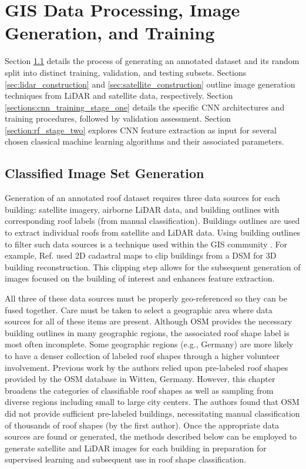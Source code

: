  
\section{GIS Data Processing, Image Generation, and Training}\label{section:image_gen_methods}



Section \ref{section:image_generation} details the process of generating an annotated dataset and its random split into distinct training, validation, and testing subsets. Sections \ref{sec:lidar_construction} and \ref{sec:satellite_construction} outline image generation techniques from LiDAR and satellite data, respectively.  Section \ref{sections:cnn_training_stage_one} details the specific \ac{CNN} architectures and training procedures, followed by validation assessment. Section \ref{section:rf_stage_two} explores \ac{CNN} feature extraction as input for several chosen classical machine learning algorithms and their associated parameters.

\subsection{Classified Image Set Generation}\label{section:image_generation}

Generation of an annotated roof dataset requires three data sources for each building: satellite imagery, airborne LiDAR data, and building outlines with corresponding roof labels (from manual classification). {Buildings outlines are used to extract individual roofs from satellite and LiDAR data. Using building outlines to filter such data sources is a technique used within the GIS community \cite{suveg_reconstruction_2004, taillandier_automatic_2005}. For example,            Ref. \cite{tack_3d_2012} used 2D cadastral maps to clip buildings from a DSM for 3D building reconstruction.  This clipping step allows for the subsequent generation of images focused on the building of interest and enhances feature extraction.} 

All three of these data sources must be properly geo-referenced so they can be fused together. Care must be taken to select a geographic area where data sources for all of these items are present. Although OSM  provides  the necessary building outlines in many geographic regions, the associated roof shape label is most often incomplete. Some geographic regions (e.g., Germany) are more likely to have a denser collection of labeled roof shapes through a higher volunteer involvement.   Previous work by the authors relied upon pre-labeled roof shapes provided by the OSM database \cite{castagno_automatic_2018} in Witten, Germany.  However, this chapter broadens the categories of classifiable roof shapes as well as sampling from diverse regions including small to large city centers. The authors found that OSM did not provide sufficient pre-labeled buildings, necessitating manual classification of thousands of roof shapes (by the first author). Once the appropriate data sources are found or generated, the methods described below can be employed to generate satellite and LiDAR images for each building in preparation for supervised learning and subsequent use in roof shape classification.

